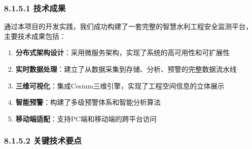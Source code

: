 \subsubsection{8.1.5.1 技术成果}\label{ux6280ux672fux6210ux679c}

通过本项目的开发实践，我们成功构建了一套完整的智慧水利工程安全监测平台，主要技术成果包括：

\begin{enumerate}
\def\labelenumi{\arabic{enumi}.}
\tightlist
\item
  \textbf{分布式架构设计}：采用微服务架构，实现了系统的高可用性和可扩展性
\item
  \textbf{实时数据处理}：建立了从数据采集到存储、分析、预警的完整数据流水线
\item
  \textbf{三维可视化}：集成Cesium三维引擎，实现了工程空间信息的立体展示
\item
  \textbf{智能预警}：构建了多级预警体系和智能分析算法
\item
  \textbf{移动端适配}：支持PC端和移动端的跨平台访问
\end{enumerate}

\subsubsection{8.1.5.2
关键技术要点}\label{ux5173ux952eux6280ux672fux8981ux70b9}

